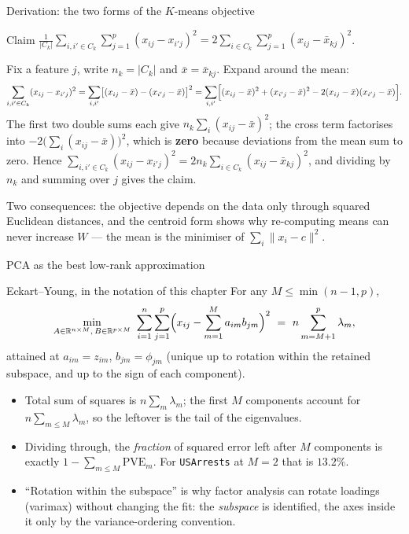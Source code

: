 \documentclass[aspectratio=169,11pt]{beamer}
\begin{document}
\begin{frame}{Derivation: the two forms of the $K$-means objective}
  \footnotesize
  \begin{block}{Claim}
    $\displaystyle \frac{1}{|C_k|}\sum_{i,i'\in C_k}\sum_{j=1}^{p}(x_{ij}-x_{i'j})^{2}
     = 2\sum_{i\in C_k}\sum_{j=1}^{p}(x_{ij}-\bar x_{kj})^{2}$.
  \end{block}
  \scriptsize
  Fix a feature $j$, write $n_k=|C_k|$ and $\bar x=\bar x_{kj}$. Expand around the mean:
  \[
    \sum_{i,i'\in C_k}(x_{ij}-x_{i'j})^{2}
    = \sum_{i,i'}\bigl[(x_{ij}-\bar x)-(x_{i'j}-\bar x)\bigr]^{2}
    = \sum_{i,i'}\Bigl[(x_{ij}-\bar x)^2 + (x_{i'j}-\bar x)^2
      - 2(x_{ij}-\bar x)(x_{i'j}-\bar x)\Bigr].
  \]
  The first two double sums each give $n_k\sum_{i}(x_{ij}-\bar x)^2$; the cross term
  factorises into $-2\bigl(\sum_i (x_{ij}-\bar x)\bigr)^2$, which is \textbf{zero} because
  deviations from the mean sum to zero. Hence
  $\sum_{i,i'\in C_k}(x_{ij}-x_{i'j})^{2}=2n_k\sum_{i\in C_k}(x_{ij}-\bar x_{kj})^{2}$,
  and dividing by $n_k$ and summing over $j$ gives the claim.
  \begin{takeaway}
    Two consequences: the objective depends on the data only through squared Euclidean
    distances, and the centroid form shows why re-computing means can never increase $W$
    --- the mean is the minimiser of $\sum_i \|x_i - c\|^2$.
  \end{takeaway}
\end{frame}

\begin{frame}{PCA as the best low-rank approximation}
  \footnotesize
  \begin{block}{Eckart--Young, in the notation of this chapter}
    For any $M\le \min(n-1,p)$,
    \[
      \min_{A\in\mathbb{R}^{n\times M},\,B\in\mathbb{R}^{p\times M}}
      \ \sum_{i=1}^{n}\sum_{j=1}^{p}\Bigl(x_{ij}-\sum_{m=1}^{M}a_{im}b_{jm}\Bigr)^{2}
      \ =\ n\sum_{m=M+1}^{p}\lambda_m ,
    \]
    attained at $a_{im}=z_{im}$, $b_{jm}=\phi_{jm}$ (unique up to rotation within the
    retained subspace, and up to the sign of each component).
  \end{block}
  \begin{readme}
    \begin{itemize}
      \item Total sum of squares is $n\sum_m \lambda_m$; the first $M$ components account
            for $n\sum_{m\le M}\lambda_m$, so the leftover is the tail of the eigenvalues.
      \item Dividing through, the \emph{fraction} of squared error left after $M$
            components is exactly $1-\sum_{m\le M}\mathrm{PVE}_m$. For
            \texttt{USArrests} at $M=2$ that is $13.2\%$.
      \item ``Rotation within the subspace'' is why factor analysis can rotate loadings
            (varimax) without changing the fit: the \emph{subspace} is identified, the axes
            inside it only by the variance-ordering convention.
    \end{itemize}
  \end{readme}
\end{frame}
\end{document}
